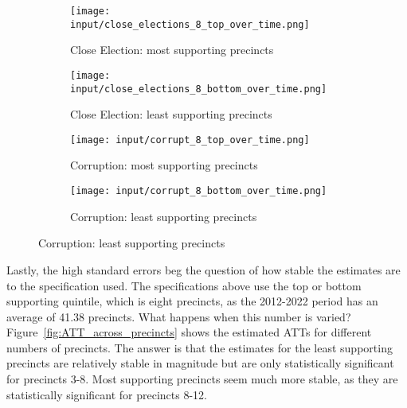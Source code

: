 \begin{figure}[H]
    \centering
    \caption{ATT over time for the four designs}
    \label{fig:ATT_over_time}

    \begin{subfigure}{.48\linewidth}
        \centering
        \texttt{[image: input/close\_elections\_8\_top\_over\_time.png]}
        \caption{Close Election: most supporting precincts}
        \label{fig:ATT_over_time:close_election_top}
    \end{subfigure}\hfill
    \begin{subfigure}{.48\linewidth}
        \centering
        \texttt{[image: input/close\_elections\_8\_bottom\_over\_time.png]}
        \caption{Close Election: least supporting precincts}
        \label{fig:ATT_over_time:close_election_bottom}
    \end{subfigure}

    \begin{subfigure}{.48\linewidth}
        \centering
        \texttt{[image: input/corrupt\_8\_top\_over\_time.png]}
        \caption{Corruption: most supporting precincts}
        \label{fig:ATT_over_time:corruption_bottom}
    \end{subfigure}\hfill
    \begin{subfigure}{.48\linewidth}
        \centering
        \texttt{[image: input/corrupt\_8\_bottom\_over\_time.png]}
        \caption{Corruption: least supporting precincts}
        \label{fig:ATT_over_time:corruption_top}
    \end{subfigure}
\end{figure}

Lastly, the high standard errors beg the question of how stable the estimates are to the specification used.
The specifications above use the top or bottom supporting quintile, which is eight precincts, as the 2012-2022 period has an average of 41.38 precincts. 
What happens when this number is varied?
Figure~\ref{fig:ATT_across_precincts} shows the estimated ATTs for different numbers of precincts. 
The answer is that the estimates for the least supporting precincts are relatively stable in magnitude but are only statistically significant for precincts 3-8.
Most supporting precincts seem much more stable, as they are statistically significant for precincts 8-12. 

